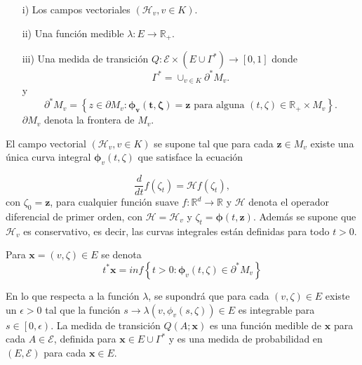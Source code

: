 \documentclass{article}
\newcommand{\rea}{\mathbb{R}}
\numberwithin{equation}{section}
\begin{document}
\begin{itemize}
\item[i)] Los campos vectoriales $\left(\mathcal{H}_{v},v\in
K\right)$. \item[ii)] Una funci\'on medible $\lambda:E\rightarrow
\rea_{+}$. \item[iii)] Una medida de transici\'on
$Q:\mathcal{E}\times\left(E\cup\Gamma^{*}\right)\rightarrow\left[0,1\right]$
donde
\begin{equation}
\Gamma^{*}=\cup_{v\in K}\partial^{*}M_{v}.
\end{equation}
y
\begin{equation}
\partial^{*}M_{v}=\left\{z\in\partial M_{v}:\mathbf{\mathbf{\phi}_{v}\left(t,\zeta\right)=\mathbf{z}}\textrm{ para alguna }\left(t,\zeta\right)\in\rea_{+}\times M_{v}\right\}.
\end{equation}
$\partial M_{v}$ denota  la frontera de $M_{v}$.
\end{itemize}

El campo vectorial $\left(\mathcal{H}_{v},v\in K\right)$ se supone
tal que para cada $\mathbf{z}\in M_{v}$ existe una \'unica curva
integral $\mathbf{\phi}_{v}\left(t,\zeta\right)$ que satisface la
ecuaci\'on

\begin{equation}
\frac{d}{dt}f\left(\zeta_{t}\right)=\mathcal{H}f\left(\zeta_{t}\right),
\end{equation}
con $\zeta_{0}=\mathbf{z}$, para cualquier funci\'on suave
$f:\rea^{d}\rightarrow\rea$ y $\mathcal{H}$ denota el operador
diferencial de primer orden, con $\mathcal{H}=\mathcal{H}_{v}$ y
$\zeta_{t}=\mathbf{\phi}\left(t,\mathbf{z}\right)$. Adem\'as se
supone que $\mathcal{H}_{v}$ es conservativo, es decir, las curvas
integrales est\'an definidas para todo $t>0$.

Para $\mathbf{x}=\left(v,\zeta\right)\in E$ se denota
\[t^{*}\mathbf{x}=inf\left\{t>0:\mathbf{\phi}_{v}\left(t,\zeta\right)\in\partial^{*}M_{v}\right\}\]

En lo que respecta a la funci\'on $\lambda$, se supondr\'a que
para cada $\left(v,\zeta\right)\in E$ existe un $\epsilon>0$ tal
que la funci\'on
$s\rightarrow\lambda\left(v,\phi_{v}\left(s,\zeta\right)\right)\in
E$ es integrable para $s\in\left[0,\epsilon\right)$. La medida de
transici\'on $Q\left(A;\mathbf{x}\right)$ es una funci\'on medible
de $\mathbf{x}$ para cada $A\in\mathcal{E}$, definida para
$\mathbf{x}\in E\cup\Gamma^{*}$ y es una medida de probabilidad en
$\left(E,\mathcal{E}\right)$ para cada $\mathbf{x}\in E$.
\end{document}
